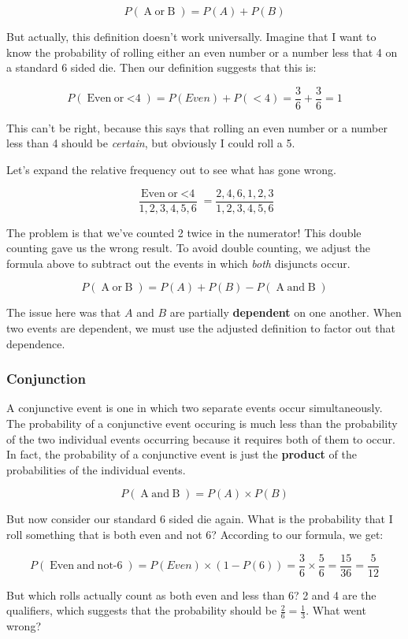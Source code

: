 \documentclass[letterpaper,10pt]{article}
\newcommand\negate[1]{\mathop{\mbox{$not$-$#1$}}}
\newcommand\disjoin[2]{\mathop{\mbox{$#1\; or\; #2$}}}
\newcommand\conjoin[2]{\mathop{\mbox{$#1\; and\; #2$}}}
\begin{document}
\[P(\disjoin{A}{B}) = P(A) + P(B)\]

But actually, this definition doesn't work universally.  Imagine that I want to know the probability of rolling either an even number or a number less that 4 on a standard 6 sided die.  Then our definition suggests that this is:

\[P(\disjoin{Even}{<4}) = P(Even) + P(<4) = \frac{3}{6} + \frac{3}{6} = 1\]

This can't be right, because this says that rolling an even number or a number less than 4 should be \textit{certain}, but obviously I could roll a 5.

Let's expand the relative frequency out to see what has gone wrong.

\[\frac{\disjoin{Even}{<4}}{1,2,3,4,5,6} = \frac{2,4,6,1,2,3}{1,2,3,4,5,6}\]

The problem is that we've counted 2 twice in the numerator! This double counting gave us the wrong result.  To avoid double counting, we adjust the formula above to subtract out the events in which \textit{both} disjuncts occur.

\[P(\disjoin{A}{B}) = P(A) + P(B) - P(\conjoin{A}{B})\]

The issue here was that $A$ and $B$ are partially \textbf{dependent} on one another.  When two events are dependent, we must use the adjusted definition to factor out that dependence.

\subsubsection{Conjunction}

A conjunctive event is one in which two separate events occur simultaneously.  The probability of a conjunctive event occuring is much less than the probability of the two individual events occurring because it requires both of them to occur. In fact, the probability of a conjunctive event is just the \textbf{product} of the probabilities of the individual events.

\[P(\conjoin{A}{B}) = P(A) \times P(B)\]

But now consider our standard 6 sided die again.  What is the probability that I roll something that is both even and not 6?  According to our formula, we get:

\[P(\conjoin{Even}{\negate{6}}) = P(Even)\times (1- P(6)) = \frac{3}{6} \times \frac{5}{6} = \frac{15}{36} =\frac{5}{12}\]

But which rolls actually count as both even and less than 6? 2 and 4 are the qualifiers, which suggests that the probability should be $\frac{2}{6} = \frac{1}{3}$.  What went wrong? 
\end{document}
